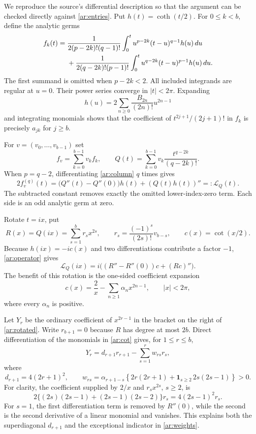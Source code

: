 We reproduce the source's differential description so that the argument
can be checked directly against \eqref{ar:entries}. Put $h(t)=\coth(t/2)$.
For $0\le k<b$, define the analytic germs
\begin{align}
 f_k(t)={}&\frac{1}{2(p-2k)!(q-1)!}
      \int_0^t u^{p-2k}(t-u)^{q-1}h(u)\,du\notag\\
 &+\frac{1}{2(q-2k)!(p-1)!}
      \int_0^t u^{q-2k}(t-u)^{p-1}h(u)\,du.
 \label{ar:column}
\end{align}
The first summand is omitted when $p-2k<2$. All included integrands
are regular at $u=0$. Their power series converge in $|t|<2\pi$.
Expanding
\[
        h(u)=2\sum_{n\ge0}\frac{B_{2n}}{(2n)!}u^{2n-1}
\]
and integrating monomials shows that the coefficient of
$t^{2j+1}/(2j+1)!$ in $f_k$ is precisely $a_{jk}$ for $j\ge b$.

For $v=(v_0,\ldots,v_{b-1})$ set
\[
 f_v=\sum_{k=0}^{b-1}v_kf_k,
 \qquad Q(t)=\sum_{k=0}^{b-1}v_k\frac{t^{q-2k}}{(q-2k)!}.
\]
When $p=q-2$, differentiating \eqref{ar:column} $q$ times gives
\begin{equation}\label{ar:operator}
 2f_v^{(q)}(t)
    =\bigl(Q''(t)-Q''(0)\bigr)h(t)+(Q(t)h(t))''
    =:\mathcal L_Q(t).
\end{equation}
The subtracted constant removes exactly the omitted lower-index-zero
term. Each side is an odd analytic germ at zero.

Rotate $t=ix$, put
\[
 R(x)=Q(ix)=\sum_{s=1}^b r_sx^{2s},\qquad
 r_s=\frac{(-1)^s}{(2s)!}v_{b-s},
 \qquad c(x)=\cot(x/2).
\]
Because $h(ix)=-ic(x)$ and two differentiations contribute a factor
$-1$, \eqref{ar:operator} gives
\begin{equation}\label{ar:rotated}
 \mathcal L_Q(ix)=i\bigl((R''-R''(0))c+(Rc)''\bigr).
\end{equation}
The benefit of this rotation is the one-sided coefficient expansion
\begin{equation}\label{ar:cot}
 c(x)=\frac2x-\sum_{n\ge1}\alpha_nx^{2n-1},\qquad |x|<2\pi,
\end{equation}
where every $\alpha_n$ is positive.

Let $Y_r$ be the ordinary coefficient of $x^{2r-1}$ in the bracket
on the right of \eqref{ar:rotated}. Write $r_{b+1}=0$ because $R$
has degree at most $2b$. Direct differentiation of the monomials in
\eqref{ar:cot} gives, for $1\le r\le b$,
\begin{equation}\label{ar:coefficient}
 Y_r=d_{r+1}r_{r+1}-\sum_{s=1}^r w_{rs}r_s,
\end{equation}
where
\begin{equation}\label{ar:weights}
 d_{r+1}=4(2r+1)^2,\qquad
 w_{rs}=\alpha_{r+1-s}
  \left\{2r(2r+1)+\mathbf1_{s\ge2}\,2s(2s-1)\right\}>0.
\end{equation}
For clarity, the coefficient supplied by $2/x$ and $r_sx^{2s}$,
$s\ge2$, is
\[
 2\{(2s)(2s-1)+(2s-1)(2s-2)\}r_s
       =4(2s-1)^2r_s.
\]
For $s=1$, the first differentiation term is removed by $R''(0)$,
while the second is the second derivative of a linear monomial and
vanishes. This explains both the superdiagonal $d_{r+1}$ and the
exceptional indicator in \eqref{ar:weights}.

